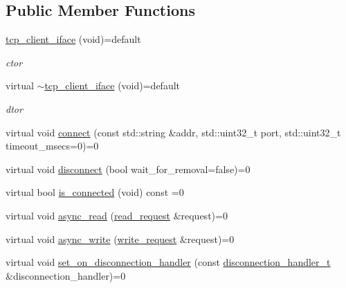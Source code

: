 \subsection*{Public Member Functions}
\begin{DoxyCompactItemize}
\item 
\mbox{\label{classcpp__redis_1_1network_1_1tcp__client__iface_a8504873049519bcebd626984e4087a90}} 
\hyperlink{classcpp__redis_1_1network_1_1tcp__client__iface_a8504873049519bcebd626984e4087a90}{tcp\+\_\+client\+\_\+iface} (void)=default
\begin{DoxyCompactList}\small\item\em ctor \end{DoxyCompactList}\item 
\mbox{\label{classcpp__redis_1_1network_1_1tcp__client__iface_a7381e8921118a13b5994101864906122}} 
virtual \hyperlink{classcpp__redis_1_1network_1_1tcp__client__iface_a7381e8921118a13b5994101864906122}{$\sim$tcp\+\_\+client\+\_\+iface} (void)=default
\begin{DoxyCompactList}\small\item\em dtor \end{DoxyCompactList}\item 
virtual void \hyperlink{classcpp__redis_1_1network_1_1tcp__client__iface_a81ee982136e85b7c3401393341bc594c}{connect} (const std\+::string \&addr, std\+::uint32\+\_\+t port, std\+::uint32\+\_\+t timeout\+\_\+msecs=0)=0
\item 
virtual void \hyperlink{classcpp__redis_1_1network_1_1tcp__client__iface_a024073fb3436d8fa99de8cad63418f6c}{disconnect} (bool wait\+\_\+for\+\_\+removal=false)=0
\item 
virtual bool \hyperlink{classcpp__redis_1_1network_1_1tcp__client__iface_a41ad0b43e3ab172828a3d2ce55d23893}{is\+\_\+connected} (void) const =0
\item 
virtual void \hyperlink{classcpp__redis_1_1network_1_1tcp__client__iface_ae1f9fa87002273a0caf340407bb68ade}{async\+\_\+read} (\hyperlink{structcpp__redis_1_1network_1_1tcp__client__iface_1_1read__request}{read\+\_\+request} \&request)=0
\item 
virtual void \hyperlink{classcpp__redis_1_1network_1_1tcp__client__iface_a9cd01e8a68479456d15d6435ffad9b92}{async\+\_\+write} (\hyperlink{structcpp__redis_1_1network_1_1tcp__client__iface_1_1write__request}{write\+\_\+request} \&request)=0
\item 
virtual void \hyperlink{classcpp__redis_1_1network_1_1tcp__client__iface_acecf3b75c3849071d82478bc7a8c97a8}{set\+\_\+on\+\_\+disconnection\+\_\+handler} (const \hyperlink{classcpp__redis_1_1network_1_1tcp__client__iface_a9a7d5942205db8be03da581a848b8ec0}{disconnection\+\_\+handler\+\_\+t} \&disconnection\+\_\+handler)=0
\end{DoxyCompactItemize}


